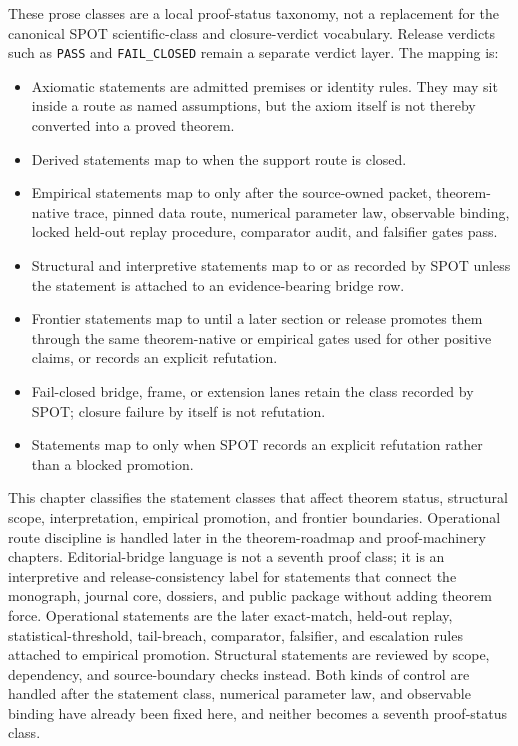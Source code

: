 These prose classes are a local proof-status taxonomy, not a replacement for
the canonical SPOT scientific-class and closure-verdict vocabulary. Release
verdicts such as \texttt{PASS} and \texttt{FAIL\_CLOSED} remain a separate
verdict layer. The mapping is:
\begin{itemize}
\item Axiomatic statements are admitted premises or identity rules. They may
      sit inside a  route as named assumptions, but
      the axiom itself is not thereby converted into a proved theorem.
\item Derived statements map to  when the support
      route is closed.
\item Empirical statements map to  only after the
      source-owned packet, theorem-native trace, pinned data route, numerical
      parameter law, observable binding, locked held-out replay procedure,
      comparator audit, and falsifier gates pass.
\item Structural and interpretive statements map to  or
       as recorded by SPOT unless the statement is attached
      to an evidence-bearing bridge row.
\item Frontier statements map to  until a later section or
      release promotes them through the same theorem-native or empirical gates
      used for other positive claims, or records an explicit refutation.
\item Fail-closed bridge, frame, or extension lanes retain the class recorded
      by SPOT; closure failure by itself is not refutation.
\item Statements map to  only when SPOT records an explicit
      refutation rather than a blocked promotion.
\end{itemize}
This chapter classifies the statement classes that affect theorem status,
structural scope, interpretation, empirical promotion, and frontier boundaries.
Operational route discipline is handled later in the theorem-roadmap and
proof-machinery chapters.
Editorial-bridge language is not a seventh proof class; it is an interpretive
and release-consistency label for statements that connect the monograph,
journal core, dossiers, and public package without adding theorem force.
Operational statements are the later exact-match, held-out replay,
statistical-threshold, tail-breach, comparator, falsifier, and escalation
rules attached to empirical promotion. Structural statements are reviewed by
scope, dependency, and source-boundary checks instead. Both kinds of control
are handled after the statement class, numerical parameter law, and observable
binding have already been fixed here, and neither becomes a seventh
proof-status class.

